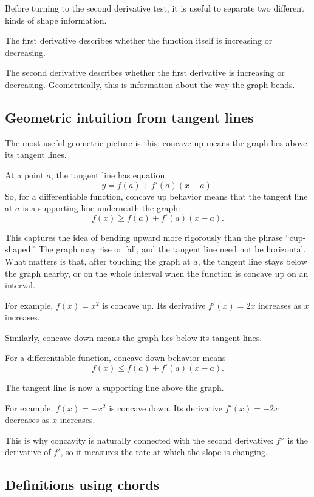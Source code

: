 \documentclass{essay}
\begin{document}
Before turning to the second derivative test, it is useful to separate two different kinds of shape information.

The first derivative describes whether the function itself is increasing or decreasing.

The second derivative describes whether the first derivative is increasing or decreasing. Geometrically, this is information about the way the graph bends.

\subsection{Geometric intuition from tangent lines}

The most useful geometric picture is this: concave up means the graph lies above its tangent lines.

At a point \(a\), the tangent line has equation
\[ y=f(a)+f'(a)(x-a). \]
So, for a differentiable function, concave up behavior means that the tangent line at \(a\) is a supporting line underneath the graph:
\[ f(x)\geq f(a)+f'(a)(x-a). \]

This captures the idea of bending upward more rigorously than the phrase ``cup-shaped.'' The graph may rise or fall, and the tangent line need not be horizontal. What matters is that, after touching the graph at \(a\), the tangent line stays below the graph nearby, or on the whole interval when the function is concave up on an interval.

For example, \(f(x)=x^{2}\) is concave up. Its derivative \(f'(x)=2x\) increases as \(x\) increases.

Similarly, concave down means the graph lies below its tangent lines.

For a differentiable function, concave down behavior means
\[ f(x)\leq f(a)+f'(a)(x-a). \]

The tangent line is now a supporting line above the graph.

For example, \(f(x)=-x^{2}\) is concave down. Its derivative \(f'(x)=-2x\) decreases as \(x\) increases.

This is why concavity is naturally connected with the second derivative: \(f''\) is the derivative of \(f'\), so it measures the rate at which the slope is changing.

\subsection{Definitions using chords}
\end{document}
